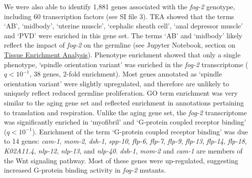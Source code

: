 \documentclass[10pt,letterpaper,twocolumn]{article}
\newcommand{\fog}{\emph{\mbox{fog-2}}}
\newcommand{\fogn}{1,881}
\newcommand{\tffog}{60}
\begin{document}
We were also able to identify \fogn{} genes associated with the \fog{} genotype,
including \tffog{} transcription factors (see SI file 3).
TEA showed that the terms `AB', `midbody', `uterine muscle', `cephalic sheath
cell', `anal depressor muscle' and `PVD' were enriched in this gene set. The
terms `AB' and `midbody' likely reflect the impact of \fog{} on the germline
(see Jupyter Notebook, section on
\href{https://wormlabcaltech.github.io/Angeles_Leighton_2016/RNASeqAnalysis.html#Run-TEA}{Tissue Enrichment Analysis}).
Phenotype enrichment showed that only a single phenotype, `spindle orientation
variant' was enriched in the \fog{} transcriptome ($q<10^{-1}$, 38 genes, 2-fold
enrichment). Most genes annotated as `spindle orientation variant' were
slightly upregulated, and therefore are unlikely to uniquely reflect reduced
germline proliferation. GO term enrichment was very similar to the aging gene
set and reflected enrichment in annotations pertaining to translation and
respiration. Unlike the aging gene set, the \fog{} transcriptome was
significantly enriched in `myofibril' and `G-protein coupled receptor binding'
($q<10^{-1}$). Enrichment of the term `G-protein coupled receptor binding' was
due to 14 genes: \emph{cam-1}, \emph{mom-2},  \emph{dsh-1}, \emph{spp-10},
\emph{flp-6}, \emph{flp-7}, \emph{flp-9}, \emph{flp-13}, \emph{flp-14},
\emph{flp-18},
\emph{K02A11.4}, \emph{nlp-12}, \emph{nlp-13}, and \emph{nlp-40}.
\emph{dsh-1},
\emph{mom-2} and \emph{cam-1} are members of the Wnt signaling pathway.
Most of these genes were up-regulated, suggesting increased G-protein binding
activity in \fog{} mutants.
\end{document}
